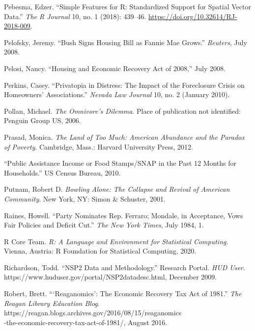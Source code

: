 \documentclass[12pt,oneside]{psthesis}
\begin{document}
\leavevmode\hypertarget{ref-pebesma2018simple}{}%
Pebesma, Edzer. ``Simple Features for R: Standardized Support for Spatial Vector Data.'' \emph{The R Journal} 10, no. 1 (2018): 439--46. \url{https://doi.org/10.32614/RJ-2018-009}.

\leavevmode\hypertarget{ref-pelofsky2008bush}{}%
Pelofsky, Jeremy. ``Bush Signs Housing Bill as Fannie Mae Grows.'' \emph{Reuters}, July 2008.

\leavevmode\hypertarget{ref-pelosi2008housing}{}%
Pelosi, Nancy. ``Housing and Economic Recovery Act of 2008,'' July 2008.

\leavevmode\hypertarget{ref-perkins2010privatopia}{}%
Perkins, Casey. ``Privatopia in Distress: The Impact of the Foreclosure Crisis on Homeowners' Associations.'' \emph{Nevada Law Journal} 10, no. 2 (January 2010).

\leavevmode\hypertarget{ref-pollan2006omnivore}{}%
Pollan, Michael. \emph{The Omnivore's Dilemma}. Place of publication not identified: Penguin Group US, 2006.

\leavevmode\hypertarget{ref-prasad2012land}{}%
Prasad, Monica. \emph{The Land of Too Much: American Abundance and the Paradox of Poverty}. Cambridge, Mass.: Harvard University Press, 2012.

\leavevmode\hypertarget{ref-2010public}{}%
``Public Assistance Income or Food Stamps/SNAP in the Past 12 Months for Households.'' US Census Bureau, 2010.

\leavevmode\hypertarget{ref-putnam2001bowling}{}%
Putnam, Robert D. \emph{Bowling Alone: The Collapse and Revival of American Community}. New York, NY: Simon \& Schuster, 2001.

\leavevmode\hypertarget{ref-raines1984party}{}%
Raines, Howell. ``Party Nominates Rep. Ferraro; Mondale, in Acceptance, Vows Fair Policies and Deficit Cut.'' \emph{The New York Times}, July 1984, 1.

\leavevmode\hypertarget{ref-rcoreteam2020language}{}%
R Core Team. \emph{R: A Language and Environment for Statistical Computing}. Vienna, Austria: R Foundation for Statistical Computing, 2020.

\leavevmode\hypertarget{ref-richardson2009nsp2}{}%
Richardson, Todd. ``NSP2 Data and Methodology.'' Research Portal. \emph{HUD User}. https://www.huduser.gov/portal/NSP2datadesc.html, December 2009.

\leavevmode\hypertarget{ref-robert2016reaganomics}{}%
Robert, Brett. ```Reaganomics': The Economic Recovery Tax Act of 1981.'' \emph{The Reagan Library Education Blog}. https://reagan.blogs.archives.gov/2016/08/15/reaganomics\\-the-economic-recovery-tax-act-of-1981/, August 2016.
\end{document}
